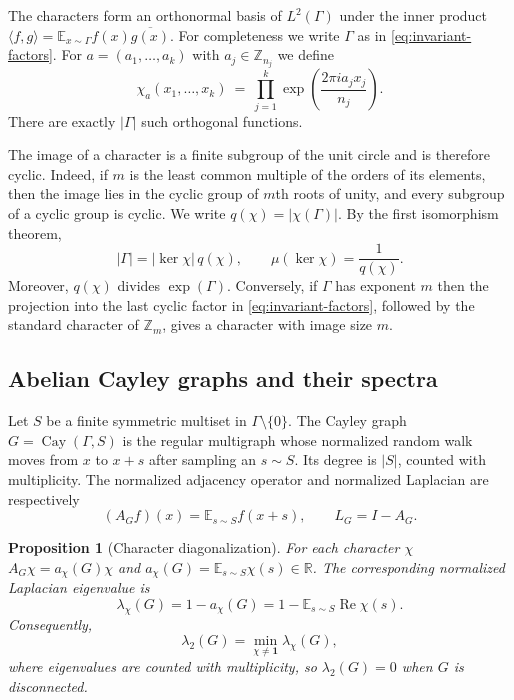 \documentclass[11pt]{article}
\newtheorem{proposition}[theorem]{Proposition}
\theoremstyle{definition}
\theoremstyle{remark}
\newcommand{\E}{\mathbb{E}}
\newcommand{\R}{\mathbb{R}}
\newcommand{\Z}{\mathbb{Z}}
\newcommand{\Cay}{\operatorname{Cay}}
\newcommand{\Ree}{\operatorname{Re}}
\begin{document}
The characters form an orthonormal basis of $L^2(\Gamma)$ under the inner product
$\langle f,g\rangle=\E_{x\sim\Gamma}f(x)\overline{g(x)}$. For completeness we write $\Gamma$ as in \eqref{eq:invariant-factors}. For $a=(a_1,\ldots,a_k)$ with $a_j\in\Z_{n_j}$ we define
\[
  \chi_a(x_1,\ldots,x_k)
  ~=~ \prod_{j=1}^k \exp \left(\frac{2\pi i a_jx_j}{n_j}\right).
\]
There are exactly $|\Gamma|$ such  orthogonal functions.


The image of a character is a finite subgroup of the unit circle and is therefore cyclic. Indeed, if $m$ is the least common multiple of the orders of its elements, then the image lies in the cyclic group of $m$th roots of unity, and every subgroup of a cyclic group is cyclic. We write $q(\chi)=|\chi(\Gamma)|.$
By the first isomorphism theorem,
\begin{equation}\label{eq:kernel-density}
  |\Gamma|=|\ker\chi|\,q(\chi),
  \qquad
  \mu(\ker\chi)=\frac1{q(\chi)}.
\end{equation}
Moreover, $q(\chi)$ divides $\exp(\Gamma)$. Conversely, if $\Gamma$ has exponent $m$ then the projection into the last cyclic factor in \eqref{eq:invariant-factors}, followed by the standard character of $\Z_m$, gives a character with image size $m$.



\subsection{Abelian Cayley graphs and their spectra}

Let $S$ be a finite symmetric multiset in $\Gamma\setminus\{0\}$. The Cayley graph $ G=\Cay(\Gamma,S)$ is the regular multigraph whose normalized random walk moves from $x$ to $x+s$ after sampling an $s\sim S$. Its degree is $|S|$, counted with multiplicity.  The normalized adjacency operator and normalized Laplacian are respectively
\[
  (A_Gf)(x)=\E_{s\sim S}f(x+s),
  \qquad
  L_G=I-A_G.
\]

\begin{proposition}[Character diagonalization]\label{prop:character-diagonalization}
For each character $\chi$ $A_G\chi=a_\chi(G)\chi$ and $a_\chi(G)=\E_{s\sim S}\chi(s)\in\R$.
The corresponding normalized Laplacian eigenvalue is
\begin{equation}\label{eq:character-eigenvalue}
  \lambda_\chi(G)
  =1-a_\chi(G)
  =1-\E_{s\sim S}\Ree\chi(s).
\end{equation}
Consequently,
\begin{equation}\label{eq:lambda2-character-min}
  \lambda_2(G)=\min_{\chi\ne\mathbf{1}}\lambda_\chi(G),
\end{equation}
where eigenvalues are counted with multiplicity, so $\lambda_2(G)=0$ when $G$ is disconnected.
\end{proposition}
\end{document}

